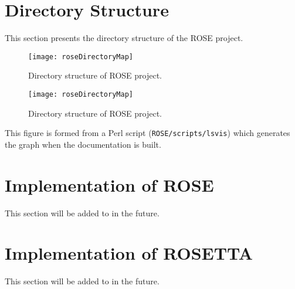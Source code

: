 \section{Directory Structure}

     This section presents the directory structure of the ROSE project.



\begin{latexonly}
\begin{figure}[tb]

\texttt{[image: roseDirectoryMap]}
\caption{Directory structure of ROSE project.}
\end{figure}
\end{latexonly}

\begin{htmlonly}
\begin{figure}[tb]

\texttt{[image: roseDirectoryMap]}
\caption{Directory structure of ROSE project.}
\label{designAndImplementation:directoryStructure}
\end{figure}
\end{htmlonly}

   This figure is formed from a Perl script ({\tt ROSE/scripts/lsvis}) which generates
the graph when the documentation is built.

\section{Implementation of ROSE}
     This section will be added to in the future.
     
\section{Implementation of ROSETTA}
     This section will be added to in the future.

